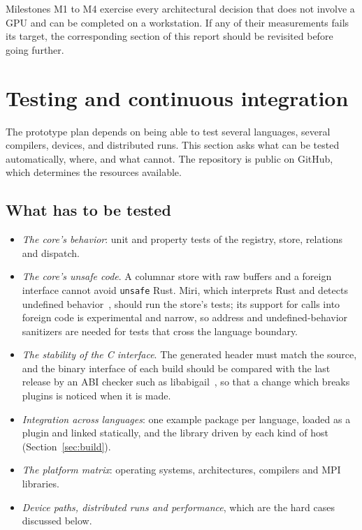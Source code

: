 \documentclass[11pt,a4paper]{article}
\newcommand{\code}[1]{\texttt{#1}}
\begin{document}
Milestones M1 to M4 exercise every architectural decision that does not
involve a GPU and can be completed on a workstation.  If any of their
measurements fails its target, the corresponding section of this report
should be revisited before going further.

\section{Testing and continuous integration}
\label{sec:ci}

The prototype plan depends on being able to test several languages, several
compilers, devices, and distributed runs.  This section asks what can be
tested automatically, where, and what cannot.  The repository is public on
GitHub, which determines the resources available.

\subsection{What has to be tested}

\begin{itemize}
  \item \emph{The core's behavior}: unit and property tests of the registry,
        store, relations and dispatch.
  \item \emph{The core's unsafe code}.  A columnar store with raw buffers and
        a foreign interface cannot avoid \code{unsafe} Rust.  Miri, which
        interprets Rust and detects undefined behavior~\cite{miri}, should
        run the store's tests; its support for calls into foreign code is
        experimental and narrow, so address and undefined-behavior
        sanitizers are needed for tests that cross the language boundary.
  \item \emph{The stability of the C interface}.  The generated header must
        match the source, and the binary interface of each build should be
        compared with the last release by an ABI checker such as
        libabigail~\cite{libabigail}, so that a change which breaks plugins
        is noticed when it is made.
  \item \emph{Integration across languages}: one example package per
        language, loaded as a plugin and linked statically, and the library
        driven by each kind of host (Section~\ref{sec:build}).
  \item \emph{The platform matrix}: operating systems, architectures,
        compilers and MPI libraries.
  \item \emph{Device paths, distributed runs and performance}, which are the
        hard cases discussed below.
\end{itemize}
\end{document}
